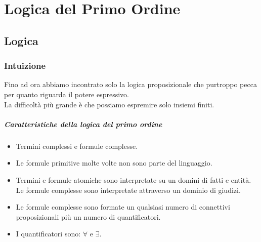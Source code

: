 \documentclass[../main.tex]{subfiles}
\begin{document}
   \part{Logica del Primo Ordine}

   \chapter{Logica}

   \section{Intuizione}
   Fino ad ora abbiamo incontrato solo la logica proposizionale che purtroppo pecca per quanto riguarda il potere espressivo.\\
   La difficoltà più grande è che possiamo espremire solo insiemi finiti.\\

   \subsubsection{Caratteristiche della logica del primo ordine}
   \begin{itemize}
      \item Termini complessi e formule complesse.
      \item Le formule primitive molte volte non sono parte del linguaggio.
      \item Termini e formule atomiche sono interpretate su un domini di fatti e entità.\\
         Le formule complesse sono interpretate attraverso un dominio di giudizi.
      \item Le formule complesse sono formate un qualsiasi numero di connettivi proposizionali più un numero di quantificatori.
      \item I quantificatori sono: $\forall$ e $\exists$.
   \end{itemize}
\end{document}
